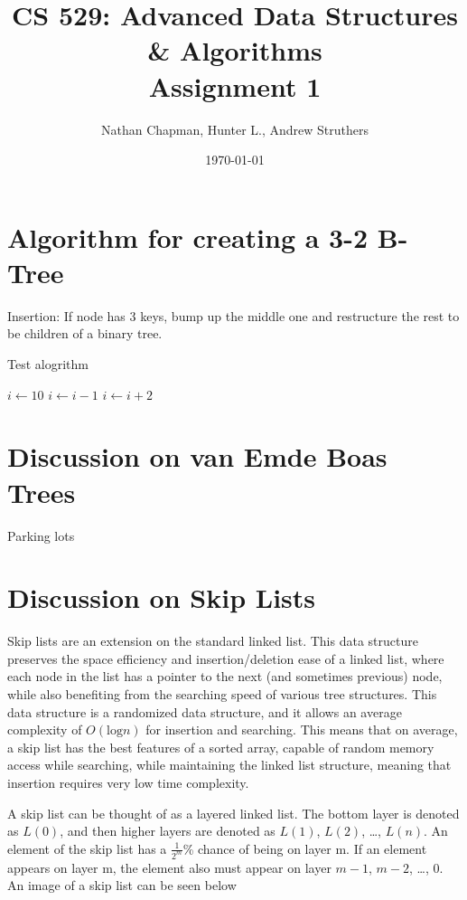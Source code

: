 \documentclass{article}
\title{CS 529: Advanced Data Structures \& Algorithms \\ Assignment 1}
\author{Nathan Chapman, Hunter L., Andrew Struthers}
\date{\today}
\begin{document}
\maketitle

\section*{Algorithm for creating a 3-2 B-Tree}

    Insertion: If node has 3 keys, bump up the middle one and restructure the rest to be children of a binary tree.

    Test alogrithm
    \begin{algorithm}
        $i\gets 10$\;
        {
            $i\gets i-1$\;
        }{
            {
                $i\gets i+2$\;
            }
        }
    \end{algorithm}

\pagebreak

\section*{Discussion on van Emde Boas Trees}

    Parking lots

\pagebreak

\section*{Discussion on Skip Lists}

Skip lists are an extension on the standard linked list. This data structure preserves the space efficiency and insertion/deletion ease of a linked list, where each node in the list has a pointer to the next (and sometimes previous) node, while also benefiting from the searching speed of various tree structures. This data structure is a randomized data structure, and it allows an average complexity of $O(\text{log} n)$ for insertion and searching. This means that on average, a skip list has the best features of a sorted array, capable of random memory access while searching, while maintaining the linked list structure, meaning that insertion requires very low time complexity. 

A skip list can be thought of as a layered linked list. The bottom layer is denoted as $L(0)$, and then higher layers are denoted as $L(1)$, $L(2)$, \ldots, $L(n)$. An element of the skip list has a $\frac{1}{2^m}$\% chance of being on layer m. If an element appears on layer m, the element also must appear on layer $m-1$, $m-2$, \ldots, $0$. An image of a skip list can be seen below
\end{document}
